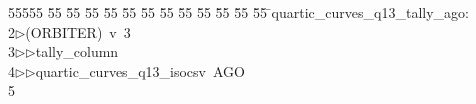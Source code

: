 %
%
\begin{tabbing}
55555 \= 55 \= 55 \= 55 \= 55 \= 55 \= 55 \= 55 \= 55 \= 55 \= 55 \= 55 \= 55 \= \>quartic\_curves\_q13\_tally\_ago:\\[0pt]
2\>$\triangleright$\>(ORBITER)\ v\ 3\ \\[0pt]
3\>$\triangleright$\>$\triangleright$\>tally\_column\ \\[0pt]
4\>$\triangleright$\>$\triangleright$\>quartic\_curves\_q13\_isocsv\ AGO\\[0pt]
5\>\end{tabbing}
